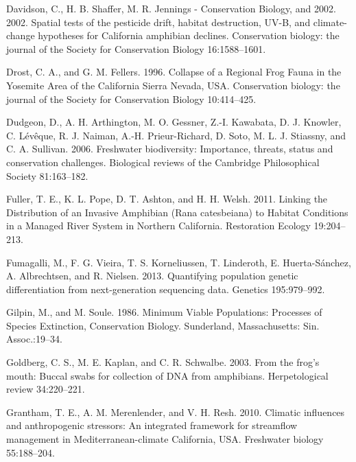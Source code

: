 \documentclass[proquest,12pt,final]{ucthesis-CA2012} %
\begin{document}
\begin{ucmainmatter}
\leavevmode\hypertarget{ref-davidson_spatial_2002}{}%
Davidson, C., H. B. Shaffer, M. R. Jennings - Conservation Biology, and
2002. 2002. Spatial tests of the pesticide drift, habitat destruction,
UV-B, and climate-change hypotheses for California amphibian declines.
Conservation biology: the journal of the Society for Conservation
Biology 16:1588--1601.

\leavevmode\hypertarget{ref-drost_collapse_1996}{}%
Drost, C. A., and G. M. Fellers. 1996. Collapse of a Regional Frog Fauna
in the Yosemite Area of the California Sierra Nevada, USA. Conservation
biology: the journal of the Society for Conservation Biology
10:414--425.

\leavevmode\hypertarget{ref-dudgeon_freshwater_2006}{}%
Dudgeon, D., A. H. Arthington, M. O. Gessner, Z.-I. Kawabata, D. J.
Knowler, C. Lévêque, R. J. Naiman, A.-H. Prieur-Richard, D. Soto, M. L.
J. Stiassny, and C. A. Sullivan. 2006. Freshwater biodiversity:
Importance, threats, status and conservation challenges. Biological
reviews of the Cambridge Philosophical Society 81:163--182.

\leavevmode\hypertarget{ref-fuller_linking_2011}{}%
Fuller, T. E., K. L. Pope, D. T. Ashton, and H. H. Welsh. 2011. Linking
the Distribution of an Invasive Amphibian (Rana catesbeiana) to Habitat
Conditions in a Managed River System in Northern California. Restoration
Ecology 19:204--213.

\leavevmode\hypertarget{ref-fumagalli_quantifying_2013}{}%
Fumagalli, M., F. G. Vieira, T. S. Korneliussen, T. Linderoth, E.
Huerta-Sánchez, A. Albrechtsen, and R. Nielsen. 2013. Quantifying
population genetic differentiation from next-generation sequencing data.
Genetics 195:979--992.

\leavevmode\hypertarget{ref-gilpin_minimum_1986}{}%
Gilpin, M., and M. Soule. 1986. Minimum Viable Populations: Processes of
Species Extinction, Conservation Biology. Sunderland, Massachusetts:
Sin. Assoc.:19--34.

\leavevmode\hypertarget{ref-goldberg_frogs_2003}{}%
Goldberg, C. S., M. E. Kaplan, and C. R. Schwalbe. 2003. From the frog's
mouth: Buccal swabs for collection of DNA from amphibians.
Herpetological review 34:220--221.

\leavevmode\hypertarget{ref-grantham_climatic_2010}{}%
Grantham, T. E., A. M. Merenlender, and V. H. Resh. 2010. Climatic
influences and anthropogenic stressors: An integrated framework for
streamflow management in Mediterranean-climate California, USA.
Freshwater biology 55:188--204.


\end{ucmainmatter}
\end{document}
